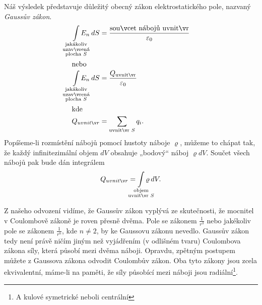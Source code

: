     Náš výsledek představuje důležitý obecný zákon elektrostatického pole, nazvaný \emph{Gaussův zákon}.
    \begin{align}
      \limitint_{\mathclap{\substack{\text{jakákoliv}      \\
                                     \text{uzavřená}       \\
                                     \text{plocha }S}}} E_n\dd{S} 
              &= \frac{\text{součet nábojů uvnitř}}{\varepsilon_0} \label{fyz:fey_eq_elstat34} \\
      \shortintertext{nebo}        
      \limitint_{\mathclap{\substack{\text{jakákoliv}       \\
                                            \text{uzavřená} \\
                                            \text{plocha }S}}} E_n\dd{S}
              &= \frac{Q_{\text{uvnitř}}}{\varepsilon_0}           \label{fyz:fey_eq_elstat35} 
              \\            
      \shortintertext{kde}
      Q_{uvnitř} 
              &= \sum\limits_{\text{uvnitř }S}q_i.                 \label{fyz:fey_eq_elstat36}  
    \end{align}
    Popíšeme-li rozmístění nábojů pomocí hustoty náboje \(\varrho\), můžeme to chápat tak, že každý 
    infinitezimální objem \(dV\) obsahuje „bodový“ náboj \(\varrho dV\). Součet všech nábojů pak 
    bude dán integrálem
    \begin{equation}\label{fyz:fey_eq_elstat37}
     Q_{uvnitř} = \limitint_{\mathclap{\substack{\text{objem}\\
                                                 \text{uvnitř }S}}} \varrho\dd{V}.
    \end{equation}
    
    Z našeho odvození vidíme, že Gaussův zákon vyplývá ze skutečnosti, že mocnitel v Coulombově 
    zákoně je roven přesně dvěma. Pole se zákonem \(\frac{1}{r^3}\) nebo jakékoliv pole se zákonem 
    \(\frac{1}{r^n}\), kde \(n\neq2\), by ke Gaussovu zákonu nevedlo. Gaussův zákon tedy není právě 
    ničím jiným než vyjádřením (v odlišném tvaru) Coulombova zákona síly, která působí mezi dvěma 
    náboji. Opravdu, zpětným postupem můžete z Gaussova zákona odvodit Coulombův zákon. Oba tyto 
    zákony jsou zcela ekvivalentní, máme-li na paměti, že síly působící mezi náboji jsou 
    radiální\footnote{A kulové symetrické neboli centrální}.
    
